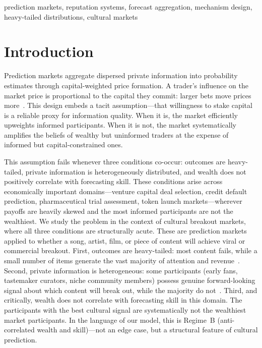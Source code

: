 \documentclass[conference]{IEEEtran}
\begin{document}
\begin{IEEEkeywords}
prediction markets, reputation systems, forecast aggregation, mechanism design, heavy-tailed distributions, cultural markets
\end{IEEEkeywords}

\section{Introduction}
\label{sec:introduction}

Prediction markets aggregate dispersed private information into probability estimates through capital-weighted price formation. A trader's influence on the market price is proportional to the capital they commit: larger bets move prices more~\cite{hanson2003,arrow2008}. This design embeds a tacit assumption---that willingness to stake capital is a reliable proxy for information quality. When it is, the market efficiently upweights informed participants. When it is not, the market systematically amplifies the beliefs of wealthy but uninformed traders at the expense of informed but capital-constrained ones.

This assumption fails whenever three conditions co-occur: outcomes are heavy-tailed, private information is heterogeneously distributed, and wealth does not positively correlate with forecasting skill. These conditions arise across economically important domains---venture capital deal selection, credit default prediction, pharmaceutical trial assessment, token launch markets---wherever payoffs are heavily skewed and the most informed participants are not the wealthiest. We study the problem in the context of cultural breakout markets, where all three conditions are structurally acute. These are prediction markets applied to whether a song, artist, film, or piece of content will achieve viral or commercial breakout. First, outcomes are heavy-tailed: most content fails, while a small number of items generate the vast majority of attention and revenue~\cite{clauset2009,salganik2006}. Second, private information is heterogeneous: some participants (early fans, tastemaker curators, niche community members) possess genuine forward-looking signal about which content will break out, while the majority do not~\cite{surowiecki2004}. Third, and critically, wealth does not correlate with forecasting skill in this domain. The participants with the best cultural signal are systematically not the wealthiest market participants. In the language of our model, this is Regime~B (anti-correlated wealth and skill)---not an edge case, but a structural feature of cultural prediction.
\end{document}
